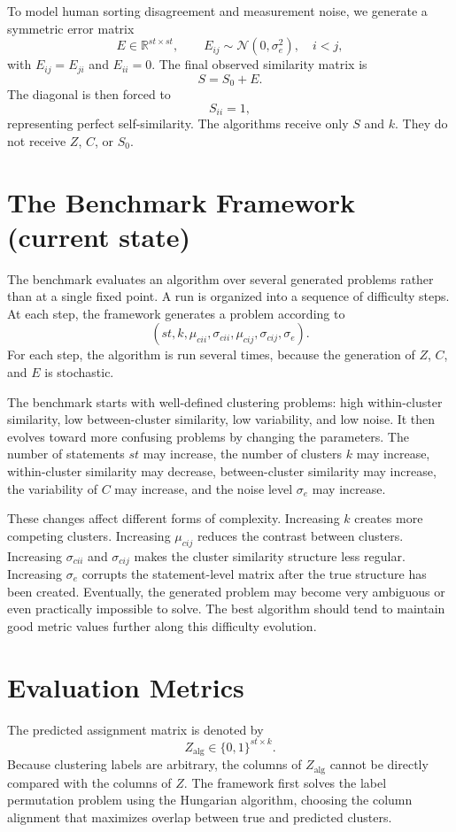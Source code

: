 \documentclass[11pt,a4paper]{article}
\begin{document}
To model human sorting disagreement and measurement noise, we generate a symmetric error matrix
\[
E \in \mathbb{R}^{st \times st},
\qquad
E_{ij} \sim \mathcal{N}(0,\sigma_e^{2}), \quad i<j,
\]
with \(E_{ij}=E_{ji}\) and \(E_{ii}=0\). The final observed similarity matrix is
\[
S = S_0 + E.
\]
The diagonal is then forced to
\[
S_{ii}=1,
\]
representing perfect self-similarity. The algorithms receive only \(S\) and \(k\). They do not receive \(Z\), \(C\), or \(S_0\).

\section{The Benchmark Framework (current state)}

The benchmark evaluates an algorithm over several generated problems rather than at a single fixed point. A run is organized into a sequence of difficulty steps. At each step, the framework generates a problem according to
\[
(st, k, \mu_{cii}, \sigma_{cii}, \mu_{cij}, \sigma_{cij}, \sigma_e).
\]
For each step, the algorithm is run several times, because the generation of \(Z\), \(C\), and \(E\) is stochastic.

The benchmark starts with well-defined clustering problems: high within-cluster similarity, low between-cluster similarity, low variability, and low noise. It then evolves toward more confusing problems by changing the parameters. The number of statements \(st\) may increase, the number of clusters \(k\) may increase, within-cluster similarity may decrease, between-cluster similarity may increase, the variability of \(C\) may increase, and the noise level \(\sigma_e\) may increase.

These changes affect different forms of complexity. Increasing \(k\) creates more competing clusters. Increasing \(\mu_{cij}\) reduces the contrast between clusters. Increasing \(\sigma_{cii}\) and \(\sigma_{cij}\) makes the cluster similarity structure less regular. Increasing \(\sigma_e\) corrupts the statement-level matrix after the true structure has been created. Eventually, the generated problem may become very ambiguous or even practically impossible to solve. The best algorithm should tend to maintain good metric values further along this difficulty evolution.

\section{Evaluation Metrics}

The predicted assignment matrix is denoted by
\[
Z_{\mathrm{alg}} \in \{0,1\}^{st \times k}.
\]
Because clustering labels are arbitrary, the columns of \(Z_{\mathrm{alg}}\) cannot be directly compared with the columns of \(Z\). The framework first solves the label permutation problem using the Hungarian algorithm, choosing the column alignment that maximizes overlap between true and predicted clusters.
\end{document}
